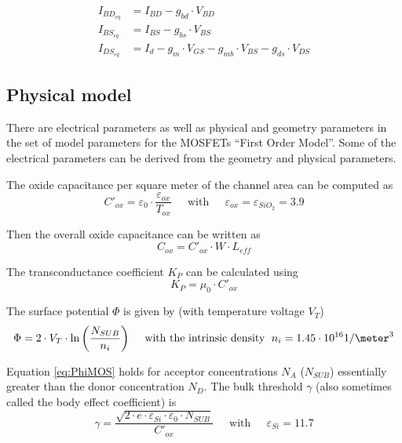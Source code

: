 \begin{align}
I_{BD_{eq}} &= I_{BD} - g_{bd} \cdot V_{BD}\\
I_{BS_{eq}} &= I_{BS} - g_{bs} \cdot V_{BS}\\
I_{DS_{eq}} &= I_{d} - g_{m} \cdot V_{GS} - g_{mb} \cdot V_{BS} - g_{ds}\cdot V_{DS}
\end{align}

\subsection{Physical model}

There are electrical parameters as well as physical and geometry
parameters in the set of model parameters for the MOSFETs ``First
Order Model''.  Some of the electrical parameters can be derived from
the geometry and physical parameters.

\addvspace{12pt}

The oxide capacitance per square meter of the channel area can be
computed as
\begin{equation}
C'_{ox} = \varepsilon_0\cdot\dfrac{\varepsilon_{ox}}{T_{ox}}
\;\;\;\; \textrm{ with } \;\;\;\;
\varepsilon_{ox} = \varepsilon_{SiO_2} = 3.9
\end{equation}

Then the overall oxide capacitance can be written as
\begin{equation}
C_{ox} = C'_{ox}\cdot W \cdot L_{eff}
\end{equation}

The transconductance coefficient $K_P$ can be calculated using
\begin{equation}
K_P = \mu_0\cdot C'_{ox}
\end{equation}

The surface potential $\Phi$ is given by (with temperature voltage $V_T$)
\begin{equation}
\Phi = 2\cdot V_T\cdot \ln{\left(\dfrac{N_{SUB}}{n_i}\right)}
\;\;\;\; \textrm{ with the intrinsic density } \;
n_i = 1.45\cdot 10^{16} 1/\meter^3
\label{eq:PhiMOS}
\end{equation}

Equation \eqref{eq:PhiMOS} holds for acceptor concentrations $N_A$
($N_{SUB}$) essentially greater than the donor concentration $N_D$.
The bulk threshold $\gamma$ (also sometimes called the body effect
coefficient) is
\begin{equation}
\gamma = \dfrac{\sqrt{2\cdot e\cdot \varepsilon_{Si}\cdot \varepsilon_{0}\cdot N_{SUB}}}{C'_{ox}}
\;\;\;\; \textrm{ with } \;\;\;\;
\varepsilon_{Si} = 11.7
\end{equation}

